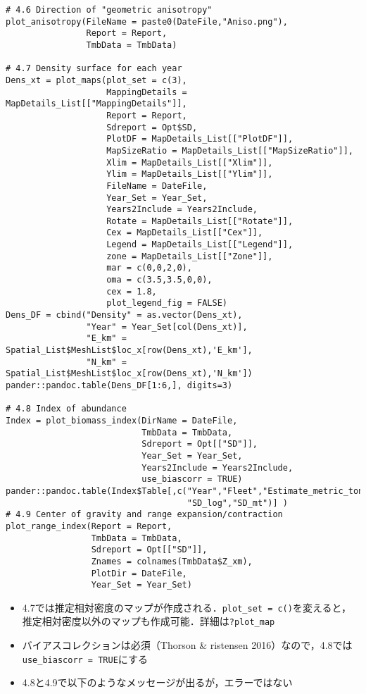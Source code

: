 \documentclass[]{article}
\providecommand{\tightlist}{%
  \setlength{\itemsep}{0pt}\setlength{\parskip}{0pt}}
\begin{document}
\begin{verbatim}
# 4.6 Direction of "geometric anisotropy"
plot_anisotropy(FileName = paste0(DateFile,"Aniso.png"),
                Report = Report,
                TmbData = TmbData)

# 4.7 Density surface for each year
Dens_xt = plot_maps(plot_set = c(3),
                    MappingDetails = MapDetails_List[["MappingDetails"]],
                    Report = Report,
                    Sdreport = Opt$SD,
                    PlotDF = MapDetails_List[["PlotDF"]],
                    MapSizeRatio = MapDetails_List[["MapSizeRatio"]],
                    Xlim = MapDetails_List[["Xlim"]],
                    Ylim = MapDetails_List[["Ylim"]],
                    FileName = DateFile,
                    Year_Set = Year_Set,
                    Years2Include = Years2Include,
                    Rotate = MapDetails_List[["Rotate"]],
                    Cex = MapDetails_List[["Cex"]],
                    Legend = MapDetails_List[["Legend"]],
                    zone = MapDetails_List[["Zone"]],
                    mar = c(0,0,2,0),
                    oma = c(3.5,3.5,0,0),
                    cex = 1.8,
                    plot_legend_fig = FALSE)
Dens_DF = cbind("Density" = as.vector(Dens_xt),
                "Year" = Year_Set[col(Dens_xt)],
                "E_km" = Spatial_List$MeshList$loc_x[row(Dens_xt),'E_km'],
                "N_km" = Spatial_List$MeshList$loc_x[row(Dens_xt),'N_km'])
pander::pandoc.table(Dens_DF[1:6,], digits=3)

# 4.8 Index of abundance
Index = plot_biomass_index(DirName = DateFile,
                           TmbData = TmbData,
                           Sdreport = Opt[["SD"]],
                           Year_Set = Year_Set,
                           Years2Include = Years2Include,
                           use_biascorr = TRUE)
pander::pandoc.table(Index$Table[,c("Year","Fleet","Estimate_metric_tons",
                                    "SD_log","SD_mt")] )
# 4.9 Center of gravity and range expansion/contraction
plot_range_index(Report = Report,
                 TmbData = TmbData,
                 Sdreport = Opt[["SD"]],
                 Znames = colnames(TmbData$Z_xm),
                 PlotDir = DateFile,
                 Year_Set = Year_Set)
\end{verbatim}

\begin{itemize}
\tightlist
\item
  4.7では推定相対密度のマップが作成される．\texttt{plot\_set\ =\ c()}を変えると，推定相対密度以外のマップも作成可能．詳細は\texttt{?plot\_map}
\item
  バイアスコレクションは必須（Thorson \& ristensen
  2016）なので，4.8では\texttt{use\_biascorr\ =\ TRUE}にする
\item
  4.8と4.9で以下のようなメッセージが出るが，エラーではない
\end{itemize}
\end{document}
